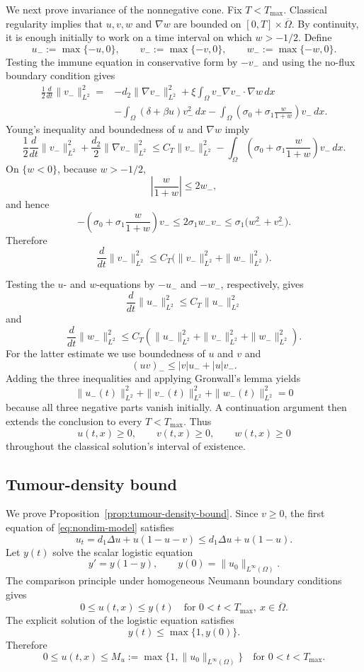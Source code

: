 \documentclass[a4paper,fleqn,longmktitle]{cas-sc}
\theoremstyle{plain}
\theoremstyle{definition}
\numberwithin{equation}{section}
\begin{document}
We next prove invariance of the nonnegative cone. Fix $T<T_{\max}$. Classical
regularity implies that $u,v,w$ and $\nabla w$ are bounded on
$[0,T]\times\overline\Omega$. By continuity, it is enough initially to work on
a time interval on which $w>-1/2$. Define
\[
 u_-:=\max\{-u,0\},\qquad
 v_-:=\max\{-v,0\},\qquad
 w_-:=\max\{-w,0\}.
\]
Testing the immune equation in conservative form by $-v_-$ and using the
no-flux boundary condition gives
\[
\begin{aligned}
\frac12\frac{d}{dt}\|v_-\|_{L^2}^2
={}&-d_2\|\nabla v_-\|_{L^2}^2
+\xi\int_\Omega v_-\nabla v_-\cdot\nabla w\,dx\\
&-\int_\Omega(\delta+\beta u)v_-^2\,dx
-\int_\Omega
\left(\sigma_0+\sigma_1\frac{w}{1+w}\right)v_-\,dx .
\end{aligned}
\]
Young's inequality and boundedness of $u$ and $\nabla w$ imply
\[
 \frac12\frac{d}{dt}\|v_-\|_{L^2}^2
 +\frac{d_2}{2}\|\nabla v_-\|_{L^2}^2
 \le C_T\|v_-\|_{L^2}^2
 -\int_\Omega
 \left(\sigma_0+\sigma_1\frac{w}{1+w}\right)v_-\,dx .
\]
On $\{w<0\}$, because $w>-1/2$,
\[
 \left|\frac{w}{1+w}\right|\le 2w_-,
\]
and hence
\[
 -\left(\sigma_0+\sigma_1\frac{w}{1+w}\right)v_-
 \le 2\sigma_1w_-v_-
 \le \sigma_1\bigl(w_-^2+v_-^2\bigr).
\]
Therefore
\[
 \frac{d}{dt}\|v_-\|_{L^2}^2
 \le C_T\bigl(\|v_-\|_{L^2}^2+\|w_-\|_{L^2}^2\bigr).
\]

Testing the $u$- and $w$-equations by $-u_-$ and $-w_-$, respectively, gives
\[
 \frac{d}{dt}\|u_-\|_{L^2}^2
 \le C_T\|u_-\|_{L^2}^2
\]
and
\[
 \frac{d}{dt}\|w_-\|_{L^2}^2
 \le C_T\left(
 \|u_-\|_{L^2}^2+\|v_-\|_{L^2}^2+\|w_-\|_{L^2}^2
 \right).
\]
For the latter estimate we use boundedness of $u$ and $v$ and
\[
 (uv)_-\le |v|u_-+|u|v_-.
\]
Adding the three inequalities and applying Gronwall's lemma yields
\[
 \|u_-(t)\|_{L^2}^2+
 \|v_-(t)\|_{L^2}^2+
 \|w_-(t)\|_{L^2}^2=0
\]
because all three negative parts vanish initially. A continuation argument
then extends the conclusion to every $T<T_{\max}$. Thus
\[
 u(t,x)\ge0,\qquad v(t,x)\ge0,\qquad w(t,x)\ge0
\]
throughout the classical solution's interval of existence.

\subsection{Tumour-density bound}
\label{app:tumour-bound}
We prove Proposition~\ref{prop:tumour-density-bound}. Since $v\ge0$, the first
equation of \eqref{eq:nondim-model} satisfies
\[
u_t
=
d_1\Delta u+u(1-u-v)
\le
d_1\Delta u+u(1-u).
\]
Let $y(t)$ solve the scalar logistic equation
\[
y'=y(1-y),
\qquad
y(0)=\|u_0\|_{L^\infty(\Omega)}.
\]
The comparison principle under homogeneous Neumann boundary conditions gives
\[
0\le u(t,x)\le y(t)
\quad
\text{for }0<t<T_{\max},\ x\in\overline\Omega.
\]
The explicit solution of the logistic equation satisfies
\[
y(t)\le \max\{1,y(0)\}.
\]
Therefore
\begin{equation}\label{eq:app-u-bound}
0\le u(t,x)\le M_u
:=
\max\{1,\|u_0\|_{L^\infty(\Omega)}\}
\quad
\text{for }0<t<T_{\max}.
\end{equation}
\end{document}
